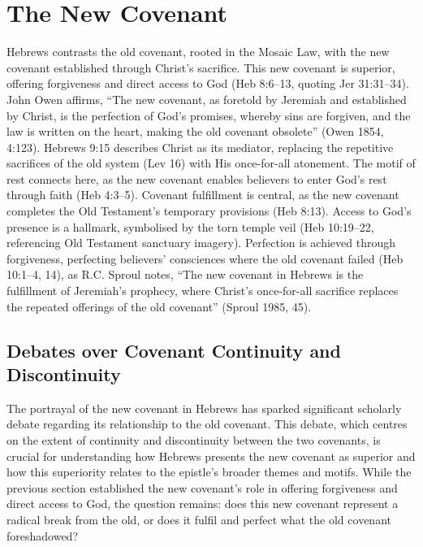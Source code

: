 \documentclass[12pt]{article}
\begin{document}
\section{The New Covenant}
Hebrews contrasts the old covenant, rooted in the Mosaic Law, with the new
covenant established through Christ’s sacrifice. This new covenant is superior,
offering forgiveness and direct access to God (Heb 8:6--13, quoting Jer
31:31--34). John Owen affirms, ``The new covenant, as foretold by Jeremiah and
established by Christ, is the perfection of God’s promises, whereby sins are
forgiven, and the law is written on the heart, making the old covenant
obsolete'' (Owen 1854, 4:123). Hebrews 9:15 describes Christ as its mediator,
replacing the repetitive sacrifices of the old system (Lev 16) with His
once-for-all atonement. The motif of rest connects here, as the new covenant
enables believers to enter God’s rest through faith (Heb 4:3--5). Covenant
fulfillment is central, as the new covenant completes the Old Testament’s
temporary provisions (Heb 8:13). Access to God’s presence is a hallmark,
symbolised by the torn temple veil (Heb 10:19--22, referencing Old Testament
sanctuary imagery). Perfection is achieved through forgiveness, perfecting
believers’ consciences where the old covenant failed (Heb 10:1--4, 14), as R.C.
Sproul notes, ``The new covenant in Hebrews is the fulfillment of Jeremiah’s
prophecy, where Christ’s once-for-all sacrifice replaces the repeated offerings
of the old covenant'' (Sproul 1985, 45).

\subsection{Debates over Covenant Continuity and Discontinuity}
The portrayal of the new covenant in Hebrews has sparked significant scholarly
debate regarding its relationship to the old covenant. This debate, which
centres on the extent of continuity and discontinuity between the two covenants,
is crucial for understanding how Hebrews presents the new covenant as superior
and how this superiority relates to the epistle’s broader themes and motifs.
While the previous section established the new covenant’s role in offering
forgiveness and direct access to God, the question remains: does this new
covenant represent a radical break from the old, or does it fulfil and perfect
what the old covenant foreshadowed?
\end{document}
